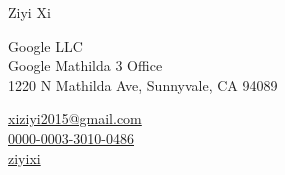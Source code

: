 \documentclass[11pt,a4paper]{article}
\makeatletter
\newcommand{\Name}{Ziyi Xi}
\newcommand{\CNName}{席子义}
\newcommand{\Email}{xiziyi2015@gmail.com}
\newcommand{\Website}{ziyixi.science}
\newcommand{\Github}{ziyixi}
\newcommand{\Orcid}{0000-0003-3010-0486}
\newcommand{\Affiliation}{Google LLC}
\newcommand{\Address}{Google Mathilda 3 Office \\ 1220 N Mathilda Ave, Sunnyvale, CA 94089}
\makeatother
\begin{document}
\thispagestyle{empty} %
{
\begin{center}
{\fontsize{24pt}{0}\selectfont \Name \hspace{1ex} \kaishu{\CNName}} \\[0.4cm]
\end{center}
\begin{minipage}[t]{0.7\textwidth}
  \fontsize{12pt}{15pt}\selectfont
  \Affiliation
  \\
  \Address
\end{minipage}
\begin{minipage}[t]{0.3\textwidth}
  \fontsize{12pt}{15pt}\selectfont
  \begin{flushleft}
    \faEnvelope \href{mailto:\Email}{\Email}
    \\
    \faOrcid \href{https://orcid.org/\Orcid}{\Orcid}
    \\
    \faGithub \href{https://github.com/\Github}{\Github}
  \end{flushleft}
\end{minipage}
}
\vspace{0.2cm}






% 


% 

% 
% 

\end{document}
